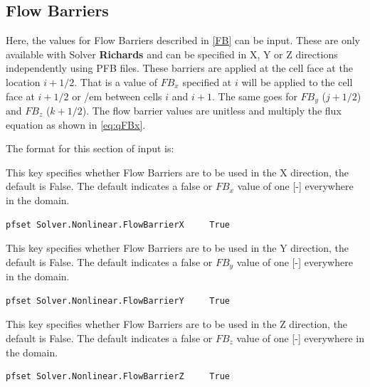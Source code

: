 \subsection{Flow Barriers}
\label{Flow Barrier Keys}

Here, the values for Flow Barriers described in \ref{FB} can be input.  These are only available with Solver {\bf Richards} and can be specified in X, Y or Z directions independently using PFB files.  These barriers are applied at the cell face at the location $i+1/2$.  That is a value of $FB_x$ specified at $i$ will be applied to the cell face at $i+1/2$ or {/em between} cells $i$ and $i+1$.  The same goes for $FB_y$ ($j+1/2$) and $FB_z$ ($k+1/2$). The flow barrier values are unitless and multiply the flux equation as shown in \ref{eq:qFBx}.

The format for this section of input is:

{
This key specifies whether Flow Barriers are to be used in the X direction, the default is False.
The default indicates a false or $FB_x$ value of one [-] everywhere in the domain.
}
\begin{display}\begin{verbatim}
pfset Solver.Nonlinear.FlowBarrierX     True
\end{verbatim}\end{display}

{
This key specifies whether Flow Barriers are to be used in the Y direction, the default is False.
The default indicates a false or $FB_y$ value of one [-] everywhere in the domain.
}
\begin{display}\begin{verbatim}
pfset Solver.Nonlinear.FlowBarrierY     True
\end{verbatim}\end{display}

{
This key specifies whether Flow Barriers are to be used in the Z direction, the default is False.
The default indicates a false or $FB_z$ value of one [-] everywhere in the domain.
}
\begin{display}\begin{verbatim}
pfset Solver.Nonlinear.FlowBarrierZ     True
\end{verbatim}\end{display}


